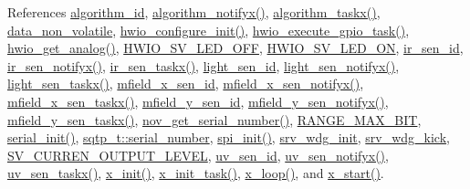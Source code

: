 References \hyperlink{a00038_source_l00034}{algorithm\+\_\+id}, \hyperlink{a00038_source_l02006}{algorithm\+\_\+notifyx()}, \hyperlink{a00038_source_l01905}{algorithm\+\_\+taskx()}, \hyperlink{a00060_source_l00016}{data\+\_\+non\+\_\+volatile}, \hyperlink{a00056_source_l00041}{hwio\+\_\+configure\+\_\+init()}, \hyperlink{a00056_source_l00272}{hwio\+\_\+execute\+\_\+gpio\+\_\+task()}, \hyperlink{a00056_source_l00223}{hwio\+\_\+get\+\_\+analog()}, \hyperlink{a00058_source_l00041}{H\+W\+I\+O\+\_\+\+S\+V\+\_\+\+L\+E\+D\+\_\+\+O\+F\+F}, \hyperlink{a00058_source_l00040}{H\+W\+I\+O\+\_\+\+S\+V\+\_\+\+L\+E\+D\+\_\+\+O\+N}, \hyperlink{a00045_source_l00023}{ir\+\_\+sen\+\_\+id}, \hyperlink{a00045_source_l00141}{ir\+\_\+sen\+\_\+notifyx()}, \hyperlink{a00045_source_l00069}{ir\+\_\+sen\+\_\+taskx()}, \hyperlink{a00047_source_l00015}{light\+\_\+sen\+\_\+id}, \hyperlink{a00047_source_l00106}{light\+\_\+sen\+\_\+notifyx()}, \hyperlink{a00047_source_l00065}{light\+\_\+sen\+\_\+taskx()}, \hyperlink{a00050_source_l00024}{mfield\+\_\+x\+\_\+sen\+\_\+id}, \hyperlink{a00050_source_l00107}{mfield\+\_\+x\+\_\+sen\+\_\+notifyx()}, \hyperlink{a00050_source_l00071}{mfield\+\_\+x\+\_\+sen\+\_\+taskx()}, \hyperlink{a00019_a99c4ad3cf8b9ce2b67351d6edf48f937}{mfield\+\_\+y\+\_\+sen\+\_\+id}, \hyperlink{a00019_a80b82366f7d22e925f279d20328f05c8}{mfield\+\_\+y\+\_\+sen\+\_\+notifyx()}, \hyperlink{a00019_adfb4e8d328a4cd1c7639082bef5841a9}{mfield\+\_\+y\+\_\+sen\+\_\+taskx()}, \hyperlink{a00060_source_l00464}{nov\+\_\+get\+\_\+serial\+\_\+number()}, \hyperlink{a00021_source_l00013}{R\+A\+N\+G\+E\+\_\+\+M\+A\+X\+\_\+B\+I\+T}, \hyperlink{a00030_source_l00159}{serial\+\_\+init()}, \hyperlink{a00033_source_l00031}{sqtp\+\_\+t\+::serial\+\_\+number}, \hyperlink{a00032_source_l00030}{spi\+\_\+init()}, \hyperlink{a00067_source_l00027}{srv\+\_\+wdg\+\_\+init}, \hyperlink{a00067_source_l00028}{srv\+\_\+wdg\+\_\+kick}, \hyperlink{a00021_source_l00050}{S\+V\+\_\+\+C\+U\+R\+R\+E\+N\+\_\+\+O\+U\+T\+P\+U\+T\+\_\+\+L\+E\+V\+E\+L}, \hyperlink{a00073_source_l00023}{uv\+\_\+sen\+\_\+id}, \hyperlink{a00073_source_l00141}{uv\+\_\+sen\+\_\+notifyx()}, \hyperlink{a00073_source_l00069}{uv\+\_\+sen\+\_\+taskx()}, \hyperlink{a00037_source_l00135}{x\+\_\+init()}, \hyperlink{a00037_source_l00173}{x\+\_\+init\+\_\+task()}, \hyperlink{a00037_source_l00231}{x\+\_\+loop()}, and \hyperlink{a00037_source_l00196}{x\+\_\+start()}.


